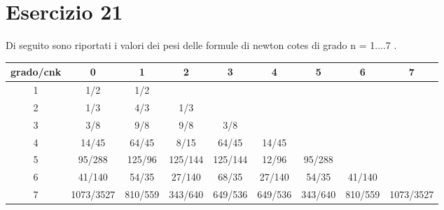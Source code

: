 \section{Esercizio 21}

Di seguito sono riportati i valori dei pesi delle formule di newton cotes di grado n = 1....7 .

\begin{table}[ht]
	\centering
	\small
	\begin{tabular}{| c| c | c| c | c |  c |  c |  c | c |}
	\hline
	grado/cnk & 0& 1 &2 &3&4&5&6&7\\
	\hline
	1 & 1/2 & 1/2 & & & & & & \\
	\hline
	2 & 1/3& 4/3 &1/3 & & & & &  \\
	\hline
	3 & 3/8 & 9/8 & 9/8 & 3/8  & & & &\\
	\hline
	4 & 14/45 & 64/45 & 8/15 & 64/45 & 14/45 & & &\\
	\hline
	5 & 95/288 & 125/96 &125/144 &125/144&12/96&95/288 && \\
	\hline
	6 &41/140& 54/35 &27/140 &68/35&27/140&54/35 &41/140 &\\
	\hline
	7 & 1073/3527 & 810/559 & 343/640 &649/536 &649/536&343/640&810/559  &1073/3527\\
	\hline
	
	\end{tabular}
\end{table}
